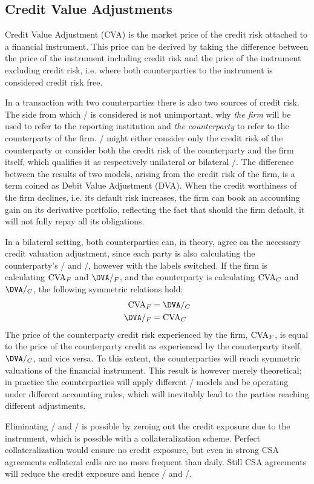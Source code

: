 \documentclass[../../../main.tex]{subfiles}
\begin{document}
    \subsection{Credit Value Adjustments}
        Credit Value Adjustment (CVA) is the market price of the credit risk attached to a financial instrument.
        This price can be derived by taking the difference between the price of the instrument including credit risk
        and the price of the instrument excluding credit risk, 
        i.e. where both counterparties to the instrument is considered credit risk free.

        In a transaction with two counterparties there is also two sources of credit risk.
        The side from which \CVA/ is considered is not unimportant, 
        why \textit{the firm} will be used to refer to the reporting institution 
        and \textit{the counterparty} to refer to the counterparty of the firm.
        \CVA/ might either consider only the credit risk of the counterparty 
        or consider both the credit risk of the counterparty and the firm itself,
        which qualifies it as respectively unilateral or bilateral \CVA/.
        The difference between the results of two models, arising from the credit risk of the firm,
        is a term coined as Debit Value Adjustment (DVA).
        When the credit worthiness of the firm declines, i.e. its default risk increases,
        the firm can book an accounting gain on its derivative portfolio,
        reflecting the fact that should the firm default, it will not fully repay all its obligations.

        In a bilateral setting, both counterparties can, in theory, agree on the necessary credit valuation adjustment,
        since each party is also calculating the counterparty's \CVA/ and \DVA/, however with the labels switched.
        If the firm is calculating $\CVA/_{F}$ and $\DVA/_{F}$, 
        and the counterparty is calculating $\CVA/_{C}$ and $\DVA/_{C}$,
        the following symmetric relations hold:
            \begin{align*}
                \CVA/_{F} &= \DVA/_{C} \\
                \DVA/_{F} &= \CVA/_{C}
            \end{align*}
        The price of the counterparty credit risk experienced by the firm, $\CVA/_{F}$,
        is equal to the price of the counterparty credit as experienced by the counterparty itself, $\DVA/_{C}$,
        and vice versa.
        To this extent, the counterparties will reach symmetric valuations of the financial instrument. 
        This result is however merely theoretical; 
        in practice the counterparties will apply different \CVA/ models
        and be operating under different accounting rules, 
        which will inevitably lead to the parties reaching different adjustments. 
        
        Eliminating \CVA/ and \DVA/ is possible by zeroing out the credit exposure due to the instrument,
        which is possible with a collateralization scheme. 
        Perfect collateralization would ensure no credit exposure,
        but even in strong CSA agreements collateral calls are no more frequent than daily.
        Still CSA agreements will reduce the credit exposure and hence \CVA/ and \DVA/.
\end{document}
